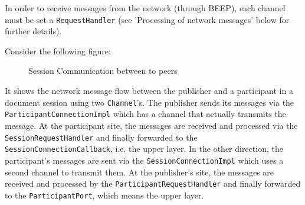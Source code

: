 In order to receive messages from the network (through BEEP), each channel must be set a \texttt{RequestHandler} (see 'Processing of network messages' below for further details).

Consider the following figure:

\begin{figure}[H]
 \centering
 \caption{Session Communication between to peers}
 \label{fig:network.protocol.requestcommunication}
\end{figure}

It shows the network message flow between the publisher and a participant in a document session using two \texttt{Channel}'s. The publisher sends its messages via the \texttt{ParticipantConnectionImpl} which has a channel that actually transmits the message. At the participant site, the messages are received and processed via the \texttt{Session\-Request\-Handler} and finally forwarded to the \texttt{Session\-Connection\-Callback}, i.e. the upper layer. In the other direction, the participant's messages are sent via the \texttt{SessionConnectionImpl} which uses a second channel to transmit them. At the publisher's site, the messages are received and processed by the \texttt{ParticipantRequestHandler} and finally forwarded to the \texttt{ParticipantPort}, which means the upper layer.


